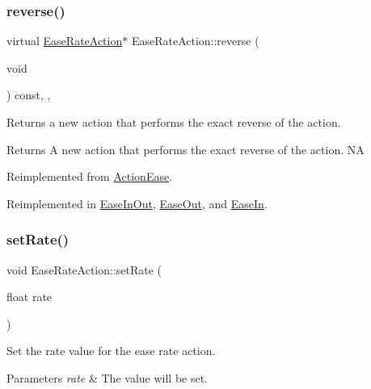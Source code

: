 \subsubsection{\texorpdfstring{reverse()}{reverse()}}
{\footnotesize\ttfamily virtual \hyperlink{classEaseRateAction}{Ease\+Rate\+Action}$\ast$ Ease\+Rate\+Action\+::reverse (\begin{DoxyParamCaption}\item[{void}]{ }\end{DoxyParamCaption}) const\hspace{0.3cm}{\ttfamily [inline]}, {\ttfamily [override]}, {\ttfamily [virtual]}}

Returns a new action that performs the exact reverse of the action.

\begin{DoxyReturn}{Returns}
A new action that performs the exact reverse of the action.  NA 
\end{DoxyReturn}


Reimplemented from \hyperlink{classActionEase_ab99eb083fa033fae1d6c948fdc730782}{Action\+Ease}.



Reimplemented in \hyperlink{classEaseInOut_ab11193be98284ab001e120888b92803f}{Ease\+In\+Out}, \hyperlink{classEaseOut_a6ad7b6fdd15cf8c5f1c3ad325c384f51}{Ease\+Out}, and \hyperlink{classEaseIn_adc23609d0a863b45012b4b6361178728}{Ease\+In}.

\mbox{\label{classEaseRateAction_add78bf76aa60e1e4b192d47c7b81b510}} 
\subsubsection{\texorpdfstring{set\+Rate()}{setRate()}\hspace{0.1cm}{\footnotesize\ttfamily [1/2]}}
{\footnotesize\ttfamily void Ease\+Rate\+Action\+::set\+Rate (\begin{DoxyParamCaption}\item[{float}]{rate }\end{DoxyParamCaption})\hspace{0.3cm}{\ttfamily [inline]}}



Set the rate value for the ease rate action. 


\begin{DoxyParams}{Parameters}
{\em rate} & The value will be set. \\
\hline
\end{DoxyParams}
\mbox{\label{classEaseRateAction_add78bf76aa60e1e4b192d47c7b81b510}} 
